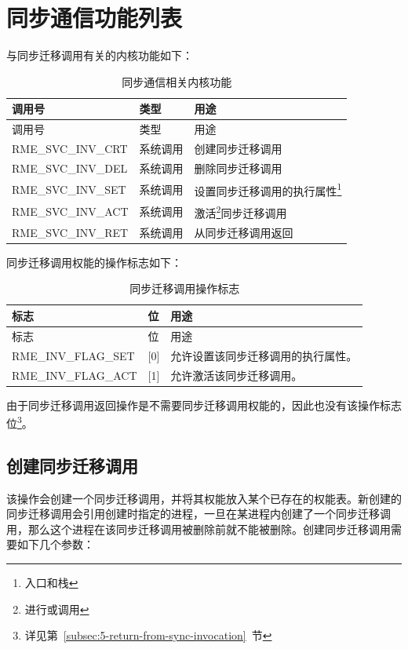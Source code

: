 \section{同步通信功能列表}\label{sec:5-sync-communication-function-list}

与同步迁移调用有关的内核功能如下：

\begin{xltabular}{\textwidth}{@{}>{\hsize\raggedright\arraybackslash}X>{\hsize\raggedright\arraybackslash}X>{\hsize\raggedright\arraybackslash}X@{}}
\caption{同步通信相关内核功能}\label{tab:5-2-sync-communication-kernel-functions}\\
\toprule
调用号 & 类型 & 用途\tabularnewline
\endfirsthead
\toprule
调用号 & 类型 & 用途\tabularnewline
\midrule
\endhead
\bottomrule
\endlastfoot
RME\_SVC\_INV\_CRT & 系统调用 & 创建同步迁移调用\tabularnewline
RME\_SVC\_INV\_DEL & 系统调用 & 删除同步迁移调用\tabularnewline
RME\_SVC\_INV\_SET & 系统调用 &
设置同步迁移调用的执行属性\footnote{入口和栈}\tabularnewline
RME\_SVC\_INV\_ACT & 系统调用 &
激活\footnote{进行或调用}同步迁移调用\tabularnewline
RME\_SVC\_INV\_RET & 系统调用 & 从同步迁移调用返回\tabularnewline
\end{xltabular}

同步迁移调用权能的操作标志如下：

\begin{xltabular}{\textwidth}{@{}>{\hsize\raggedright\arraybackslash}X>{\hsize\raggedright\arraybackslash}X>{\hsize\raggedright\arraybackslash}X@{}}
\caption{同步迁移调用操作标志}\label{tab:5-3-sync-invocation-operation-flags}\\
\toprule
标志 & 位 & 用途\tabularnewline
\endfirsthead
\toprule
标志 & 位 & 用途\tabularnewline
\midrule
\endhead
\bottomrule
\endlastfoot
RME\_INV\_FLAG\_SET & {[}0{]} &
允许设置该同步迁移调用的执行属性。\tabularnewline
RME\_INV\_FLAG\_ACT & {[}1{]} & 允许激活该同步迁移调用。\tabularnewline
\end{xltabular}

由于同步迁移调用返回操作是不需要同步迁移调用权能的，因此也没有该操作标志位\footnote{详见第~\ref{subsec:5-return-from-sync-invocation}~节}。

\subsection{创建同步迁移调用}\label{subsec:5-create-sync-invocation}

该操作会创建一个同步迁移调用，并将其权能放入某个已存在的权能表。新创建的同步迁移调用会引用创建时指定的进程，一旦在某进程内创建了一个同步迁移调用，那么这个进程在该同步迁移调用被删除前就不能被删除。创建同步迁移调用需要如下几个参数：

